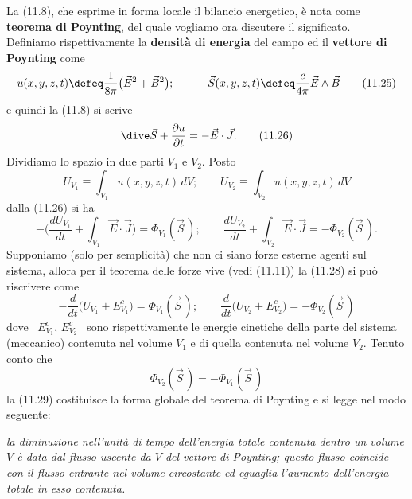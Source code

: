 La (11.8), che esprime in forma locale il bilancio energetico, \`e nota come
\textbf{teorema di Poynting}, del quale vogliamo ora discutere il significato.\\
Definiamo rispettivamente la \textbf{densit\`a di energia} del campo ed il
\textbf{vettore di Poynting} come
\begin{equation}
  u(x,y,z,t)\defeq\frac{1}{8\pi}\big(\vec E^2+\vec B^2\big);
  \qquad\quad\vec S(x,y,z,t)\defeq\frac{c}{4\pi}\vec E\wedge\vec B
  \tag{11.25}
\end{equation}
e quindi la (11.8) si scrive
\begin{equation}
  \dive\vec S+\frac{\partial u}{\partial t}=-\vec E\cdot\vec J.
  \tag{11.26}
\end{equation}
Dividiamo lo spazio in due parti $V_1$ e $V_2$. Posto
\begin{equation}
  U_{V_1}\equiv\int_{V_1}u(x,y,z,t)\,dV;
  \qquad U_{V_2}\equiv\int_{V_2}u(x,y,z,t)\,dV
  \tag{11.27}
\end{equation}
dalla (11.26) si ha
\begin{equation}
  -\Big(\frac{dU_{V_1}}{dt}+\int_{V_1}\vec E\cdot\vec J\Big)
  =\Phi_{V_1}(\vec S\,);
  \qquad\frac{dU_{V_2}}{dt}+\int_{V_2}\vec E\cdot\vec J=-\Phi_{V_2}(\vec S\,).
  \tag{11.28}
\end{equation}
Supponiamo (solo per semplicit\`a) che non ci siano forze esterne agenti sul
sistema, allora per il teorema delle forze vive \big(vedi (11.11)\big) la
(11.28) si pu\`o riscrivere come
\begin{equation}
  -\frac{d}{dt}\Big(U_{V_1}+E_{V_1}^c\Big)=\Phi_{V_1}(\vec S\,);
  \qquad\frac{d}{dt}\Big(U_{V_2}+E_{V_2}^c\Big)=-\Phi_{V_2}(\vec S\,)
  \tag{11.29}
\end{equation}
dove \ $E_{V_1}^c$, $E_{V_2}^c$ \ sono rispettivamente le energie cinetiche
della parte del sistema (meccanico) contenuta nel volume $V_1$ e di quella
contenuta nel volume $V_2$. Tenuto conto che
\begin{equation}
  \Phi_{V_2}(\vec S\,)=-\Phi_{V_1}(\vec S\,)
  \tag{11.30}
\end{equation}
la (11.29) costituisce la forma globale del teorema di Poynting e si legge nel
modo seguente:

\textit{la diminuzione nell'unit\`a di tempo dell'energia totale contenuta
dentro un volume $V$ \`e data dal flusso uscente da $V$ del vettore di Poynting;
questo flusso coincide con il flusso entrante nel volume circostante ed eguaglia
l'aumento dell'energia totale in esso contenuta.}


